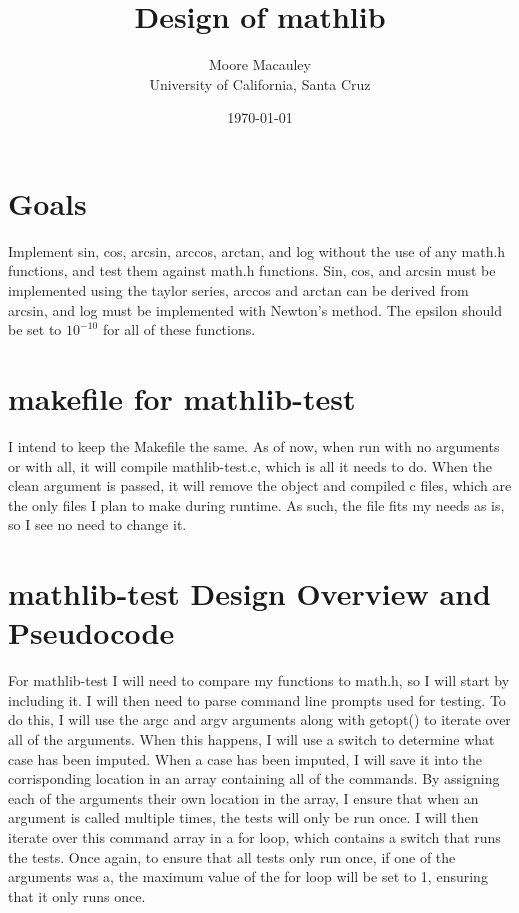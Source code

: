 \documentclass[11pt]{article}
\title{Design of mathlib}
\author{Moore Macauley \\ University of California, Santa Cruz}
\date{\today}
\begin{document}
\maketitle

\section{Goals}\label{ss:goals}
Implement sin, cos, arcsin, arccos, arctan, and log without the use of any math.h functions, and test them against math.h functions. Sin, cos, and arcsin must be implemented using the taylor series,
arccos and arctan can be derived from arcsin, and log must be implemented with Newton’s method. The epsilon should be set to $10^{-10}$ for all of these functions.

\section{makefile for mathlib-test}\label{ss:make}

I intend to keep the Makefile the same. As of now, when run with no arguments or with all, it will compile mathlib-test.c, which is all it needs to do. When the clean argument is passed, it will remove the object and compiled c files, which are the only files I plan to make during runtime. As such, the file fits my needs as is, so I see no need to change it.

\section{mathlib-test Design Overview and Pseudocode}\label{ss:main}

For mathlib-test I will need to compare my functions to math.h, so I will start by including it. I will then need to parse command line prompts used for testing. To do this, I will use the argc and argv arguments along with getopt() to iterate over all of the arguments. When this happens, I will use a switch to determine what case has been imputed. When a case has been imputed, I will save it into the corrisponding location in an array containing all of the commands. By assigning each of the arguments their own location in the array, I ensure that when an argument is called multiple times, the tests will only be run once. I will then iterate over this command array in a for loop, which contains a switch that runs the tests. Once again, to ensure that all tests only run once, if one of the arguments was a, the maximum value of the for loop will be set to 1, ensuring that it only runs once.
\end{document}

